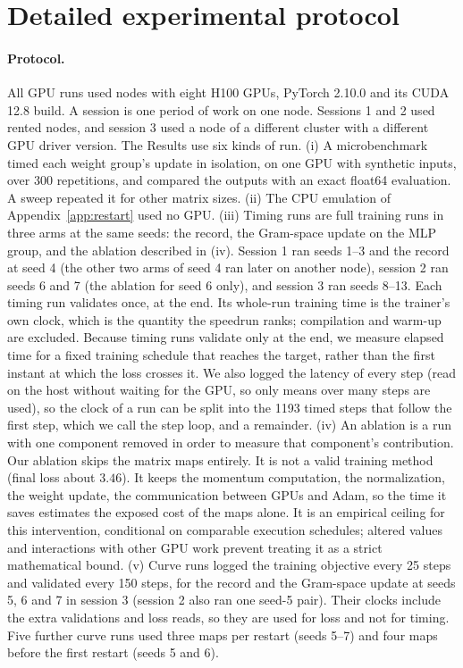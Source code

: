 \documentclass{article}
\begin{document}
\section{Detailed experimental protocol}\label{app:protocol}
\paragraph{Protocol.} All GPU runs used nodes with eight H100 GPUs, PyTorch 2.10.0 and its CUDA 12.8 build. A session is one period of work on one node. Sessions 1 and 2 used rented nodes, and session 3 used a node of a different cluster with a different GPU driver version. The Results use six kinds of run.
(i) A microbenchmark timed each weight group's update in isolation, on one GPU with synthetic inputs, over 300 repetitions, and compared the outputs with an exact float64 evaluation. A sweep repeated it for other matrix sizes.
(ii) The CPU emulation of Appendix~\ref{app:restart} used no GPU.
(iii) Timing runs are full training runs in three arms at the same seeds: the record, the Gram-space update on the MLP group, and the ablation described in (iv). Session 1 ran seeds 1--3 and the record at seed 4 (the other two arms of seed 4 ran later on another node), session 2 ran seeds 6 and 7 (the ablation for seed 6 only), and session 3 ran seeds 8--13. Each timing run validates once, at the end. Its whole-run training time is the trainer's own clock, which is the quantity the speedrun ranks; compilation and warm-up are excluded. Because timing runs validate only at the end, we measure elapsed time for a fixed training schedule that reaches the target, rather than the first instant at which the loss crosses it. We also logged the latency of every step (read on the host without waiting for the GPU, so only means over many steps are used), so the clock of a run can be split into the 1193 timed steps that follow the first step, which we call the step loop, and a remainder.
(iv) An ablation is a run with one component removed in order to measure that component's contribution. Our ablation skips the matrix maps entirely. It is not a valid training method (final loss about $3.46$). It keeps the momentum computation, the normalization, the weight update, the communication between GPUs and Adam, so the time it saves estimates the exposed cost of the maps alone. It is an empirical ceiling for this intervention, conditional on comparable execution schedules; altered values and interactions with other GPU work prevent treating it as a strict mathematical bound.
(v) Curve runs logged the training objective every 25 steps and validated every 150 steps, for the record and the Gram-space update at seeds 5, 6 and 7 in session 3 (session 2 also ran one seed-5 pair). Their clocks include the extra validations and loss reads, so they are used for loss and not for timing. Five further curve runs used three maps per restart (seeds 5--7) and four maps before the first restart (seeds 5 and 6).
\end{document}
